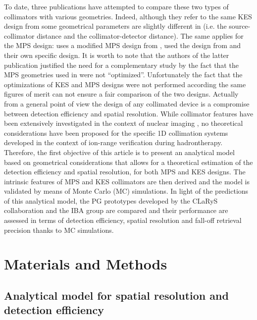 \documentclass[a4paper,english,12pt]{article}
\newcommand{\qq}[1]{\enquote{#1}}
\begin{document}
To date, three publications \citep{Smeets2016, Lin2017, Park2017} have attempted to compare these two types of collimators with various geometries. Indeed, although they refer to the same KES design from \citep{Perali2014} some geometrical parameters are slightly different in \citep{Lin2017, Park2017} (i.e. the source-collimator distance and the collimator-detector distance). The same applies for the MPS design: \cite{Smeets2016} uses a modified MPS design from \cite{Pinto2014a}, \cite{Lin2017} used the design from \cite{Gueth2013} and \cite{Park2017} their own specific design. It is worth to note that the authors of the latter publication justified the need for a complementary study by the fact that the MPS geometries used in \cite{Smeets2016, Lin2017} were not \qq{optimized}.
Unfortunately the fact that the optimizations of KES and MPS designs were not performed according the same figures of merit can not ensure a fair comparison of the two designs. Actually from a general point of view the design of any collimated device is a compromise between detection efficiency and spatial resolution. While collimator features have been extensively investigated in the context of nuclear imaging \citep{Gunter2004}, no theoretical considerations have been proposed for the specific 1D collimation systems developed in the context of ion-range verification during hadrontherapy.
Therefore, the first objective of this article is to present an analytical model based on geometrical considerations that allows for a theoretical estimation of the detection efficiency and spatial resolution, for both MPS and KES designs. The intrinsic features of MPS and KES collimators are then derived and the model is validated by means of Monte Carlo (MC) simulations. In light of the predictions of this analytical model, the PG prototypes developed by the CLaRyS collaboration \citep{Pinto2014a, Krimmer2015} and the IBA group \citep{Perali2014} are compared and their performance are assessed in terms of detection efficiency, spatial resolution and fall-off retrieval precision thanks to MC simulations.


\section{Materials and Methods \label{sec:MM}}

\subsection{Analytical model for spatial resolution and detection efficiency}
\end{document}
